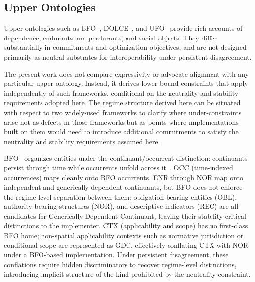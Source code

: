 \subsection{Upper Ontologies}

Upper ontologies such as BFO~\citep{smith2015basic}, DOLCE~\citep{gangemi2002dolce},
and UFO~\citep{guizzardi2005ontological} provide rich accounts of dependence,
endurants and perdurants, and social objects.
They differ substantially in commitments and optimization objectives, and
are not designed primarily as neutral substrates for interoperability under
persistent disagreement.

The present work does not compare expressivity or advocate alignment with any
particular upper ontology.
Instead, it derives lower-bound constraints that apply independently of such
frameworks, conditional on the neutrality and stability requirements adopted here.
The regime structure derived here can be situated with respect to two
widely-used frameworks to clarify where under-constraints arise
not as defects in those frameworks but as points where implementations
built on them would need to introduce additional commitments
to satisfy the neutrality and stability requirements assumed here.

BFO~\citep{smith2015basic} organizes entities under the
continuant/occurrent distinction:
continuants persist through time
while occurrents unfold across it~\citep{arp2015building}.
OCC (time-indexed occurrences) maps cleanly onto BFO occurrents.
ENR through NOR map onto independent and generically dependent continuants,
but BFO does not enforce the regime-level separation between them:
obligation-bearing entities (OBL), authority-bearing structures (NOR),
and descriptive indicators (REC) are all candidates for
Generically Dependent Continuant, leaving their
stability-critical distinctions to the implementer.
CTX (applicability and scope) has no first-class BFO home;
non-spatial applicability contexts such as normative jurisdiction
or conditional scope are represented as GDC, effectively
conflating CTX with NOR under a BFO-based implementation.
Under persistent disagreement, these conflations require
hidden discriminators to recover regime-level distinctions,
introducing implicit structure of the kind
prohibited by the neutrality constraint.

